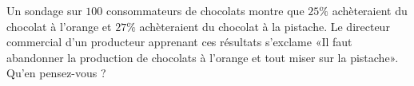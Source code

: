 
\begin{exercice}\label{exosmath-0386}

    Un sondage sur \( 100\) consommateurs de chocolats montre que \( 25\%\) achèteraient du chocolat à l'orange et \( 27\%\) achèteraient du chocolat à la pistache. Le directeur commercial d'un producteur apprenant ces résultats s'exclame «Il faut abandonner la production de chocolats à l'orange et tout miser sur la pistache». Qu'en pensez-vous ?

\end{exercice}
